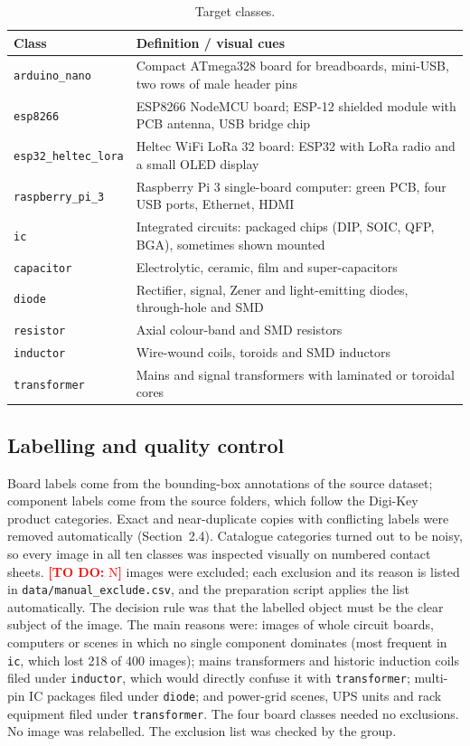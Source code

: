 \documentclass[11pt,a4paper]{article}
\newcommand{\fillin}[1]{\textcolor{red}{\textbf{[TO DO:} #1\textbf{]}}}
\providecommand{\NumManual}{\fillin{N}}
\begin{document}
\begin{table}[H]\centering\small
\caption{Target classes.}\label{tab:classes}
\begin{tabular}{lp{11cm}}\toprule
Class & Definition / visual cues \\\midrule
\texttt{arduino\_nano} & Compact ATmega328 board for breadboards, mini-USB, two rows of male header pins \\
\texttt{esp8266} & ESP8266 NodeMCU board; ESP-12 shielded module with PCB antenna, USB bridge chip \\
\texttt{esp32\_heltec\_lora} & Heltec WiFi LoRa 32 board: ESP32 with LoRa radio and a small OLED display \\
\texttt{raspberry\_pi\_3} & Raspberry Pi 3 single-board computer: green PCB, four USB ports, Ethernet, HDMI \\
\texttt{ic} & Integrated circuits: packaged chips (DIP, SOIC, QFP, BGA), sometimes shown mounted \\
\texttt{capacitor} & Electrolytic, ceramic, film and super-capacitors \\
\texttt{diode} & Rectifier, signal, Zener and light-emitting diodes, through-hole and SMD \\
\texttt{resistor} & Axial colour-band and SMD resistors \\
\texttt{inductor} & Wire-wound coils, toroids and SMD inductors \\
\texttt{transformer} & Mains and signal transformers with laminated or toroidal cores \\
\bottomrule\end{tabular}\end{table}

\subsection{Labelling and quality control}
Board labels come from the bounding-box annotations of the source dataset; component labels come from the source folders, which follow the Digi-Key product categories. Exact and near-duplicate copies with conflicting labels were removed automatically (Section~2.4). Catalogue categories turned out to be noisy, so every image in all ten classes was inspected visually on numbered contact sheets. \NumManual{} images were excluded; each exclusion and its reason is listed in \texttt{data/manual\_exclude.csv}, and the preparation script applies the list automatically. The decision rule was that the labelled object must be the clear subject of the image. The main reasons were: images of whole circuit boards, computers or scenes in which no single component dominates (most frequent in \texttt{ic}, which lost 218 of 400 images); mains transformers and historic induction coils filed under \texttt{inductor}, which would directly confuse it with \texttt{transformer}; multi-pin IC packages filed under \texttt{diode}; and power-grid scenes, UPS units and rack equipment filed under \texttt{transformer}. The four board classes needed no exclusions. No image was relabelled. The exclusion list was checked by the group.
\end{document}
